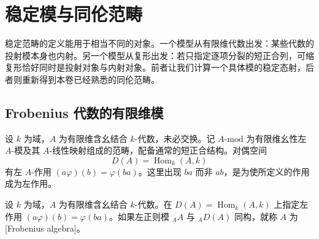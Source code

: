 
\section{稳定模与同伦范畴}
\label{b4:sec:D02}

稳定范畴的定义能用于相当不同的对象。一个模型从有限维代数出发：某些代数的投射模本身也内射。另一个模型从复形出发：若只指定逐项分裂的短正合列，可缩复形恰好同时是投射对象与内射对象。前者让我们计算一个具体模的稳定态射，后者则重新得到本卷已经熟悉的同伦范畴。

\subsection{Frobenius 代数的有限维模}
\label{b4:subsec:D02:01}

设 \(k\) 为域，\(A\) 为有限维含幺结合 \(k\)-代数，未必交换。记 \(A\text{-}\mathrm{mod}\) 为有限维幺性左 \(A\)-模及其 \(A\)-线性映射组成的范畴，配备通常的短正合结构。对偶空间
\[
	D(A)=\operatorname{Hom}_k(A,k)
\]
有左 \(A\)-作用 \((a\varphi)(b)=\varphi(ba)\)。这里出现 \(ba\) 而非 \(ab\)，是为使所定义的作用成为左作用。

\begin{definition}\label{b4:def:D-frobenius-algebra}
	设 \(k\) 为域，\(A\) 为有限维含幺结合 \(k\)-代数。在 \(D(A)=\operatorname{Hom}_k(A,k)\) 上指定左作用 \((a\varphi)(b)=\varphi(ba)\)。如果左正则模 \({}_AA\) 与 \({}_AD(A)\) 同构，就称 \(A\) 为 [Frobenius algebra]。
\end{definition}


